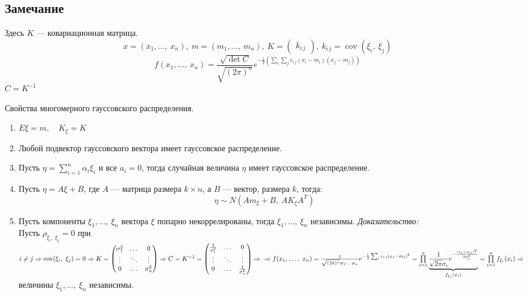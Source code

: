 \documentclass[12pt, a4paper]{article}
\begin{document}
    \subsection*{Замечание}
    Здесь $K$ --- ковариационная матрица.
    \[x = (x_1,\dots,\ x_n),\ m = (m_1,\dots,\ m_n),\ K = \begin{pmatrix}
        k_{i\, j}
    \end{pmatrix},\ k_{i\, j} = \operatorname{cov}(\xi_i,\ \xi_j)\]
    \[f(x_1,\dots,\ x_n) = \frac{\sqrt{\det C}}{\sqrt{(2\pi)^n}} e^{-\frac{1}{2}\left( \sum_i\sum_j c_{i\, j} (x_i - m_i)(x_j - m_j) \right)}\]
    $C = K^{-1}$
    \begin{center}
        Свойства многомерного гауссовского распределения.
    \end{center}
    \begin{enumerate}
        \item $E\xi = m,\quad K_{\xi} = K$
        \item Любой подвектор гауссовского вектора имеет гауссовское распределение.
        \item Пусть $\displaystyle\eta = \sum_{i = 1}^{n} \alpha_i \xi_i$ и все $a_i = 0$, тогда случайная величина $\eta$ имеет гауссовское распределение. 
        \item Пусть $\eta = A\xi + B$, где $A$ --- матрица размера $k\times n$, а $B$ --- вектор, размера $k$, тогда:
        \[\eta \sim N(Am_\xi + B,\ AK_{\xi} A^T)\]
        \item Пусть компоненты $\xi_1,\dots,\ \xi_n$ вектора $\xi$ попарно некоррелированы, тогда $\xi_1,\dots,\ \xi_n$ независимы.
        \textit{Доказательство:}\\
        Пусть $\displaystyle\rho_{\xi_i,\ \xi_j} = 0$ при $i \neq j\Rightarrow \operatorname{cov}(\xi_i,\ \xi_j) = 0\Rightarrow K = \begin{pmatrix}
            \sigma^2_1 &\dots &  0\\
            \vdots & \ddots & \vdots\\
            0 & \dots & \sigma_n^2
        \end{pmatrix} \Rightarrow C = K^{-1} = \begin{pmatrix}
            \frac{1}{\sigma^2_1} &\dots &  0\\
            \vdots & \ddots & \vdots\\
            0 & \dots & \frac{1}{\sigma_n^2}
        \end{pmatrix}\Rightarrow\\
        \Rightarrow  f(x_1,\dots,\ x_n) = \frac{1}{\sqrt{(2\pi)^n}\sigma_1\cdot\dots \sigma_n}e^{-\frac{1}{2}\sum_{i} c_{i\, i}(x_i - m_i)^2} = \prod\limits_{i = 1}^{n} \underset{f_{\xi_i}(x_i)}{\underbrace{\frac{1}{\sqrt{2\pi}\sigma_i}e^{-\frac{(x_i - m_i)^2}{2\sigma_i^2}}}} = \prod\limits_{i = 1}^{n} f_{\xi_i}(x_i)\Rightarrow$ величины $\xi_1,\dots,\ \xi_n$ независимы.
    \end{enumerate}
\end{document}
